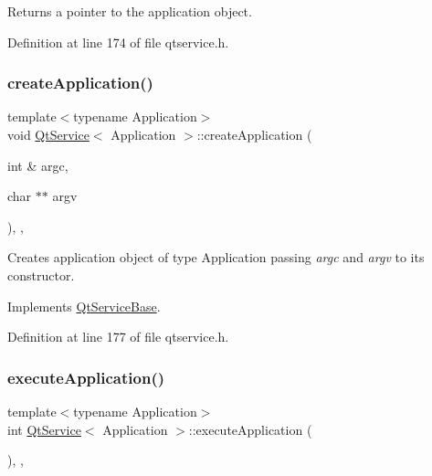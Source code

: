 Returns a pointer to the application object. 

Definition at line 174 of file qtservice.\+h.

\mbox{\label{class_qt_service_a50aa2079345abfd0b1284be47e245b0b}} 
\subsubsection{\texorpdfstring{create\+Application()}{createApplication()}}
{\footnotesize\ttfamily template$<$typename Application$>$ \\
void \mbox{\hyperlink{class_qt_service}{Qt\+Service}}$<$ Application $>$\+::create\+Application (\begin{DoxyParamCaption}\item[{int \&}]{argc,  }\item[{char $\ast$$\ast$}]{argv }\end{DoxyParamCaption})\hspace{0.3cm}{\ttfamily [inline]}, {\ttfamily [protected]}, {\ttfamily [virtual]}}

Creates application object of type Application passing {\itshape argc} and {\itshape argv} to its constructor.

Implements \mbox{\hyperlink{class_qt_service_base_ac5ae73935f489282b35c70b27b341390}{Qt\+Service\+Base}}.



Definition at line 177 of file qtservice.\+h.

\mbox{\label{class_qt_service_a84f5f60304117e1f11cc0ed16dc0b72e}} 
\subsubsection{\texorpdfstring{execute\+Application()}{executeApplication()}}
{\footnotesize\ttfamily template$<$typename Application$>$ \\
int \mbox{\hyperlink{class_qt_service}{Qt\+Service}}$<$ Application $>$\+::execute\+Application (\begin{DoxyParamCaption}{ }\end{DoxyParamCaption})\hspace{0.3cm}{\ttfamily [inline]}, {\ttfamily [protected]}, {\ttfamily [virtual]}}



